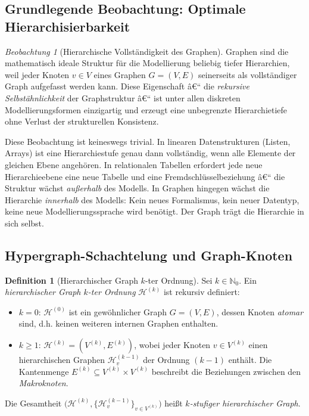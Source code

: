 ﻿\documentclass[12pt,a4paper,twoside]{article}
\theoremstyle{definition}
\newtheorem{definition}{Definition}[section]
\theoremstyle{plain}
\theoremstyle{remark}
\newtheorem{beobachtung}{Beobachtung}[section]
\begin{document}
\subsection{Grundlegende Beobachtung: Optimale Hierarchisierbarkeit}
\label{sub:beobachtung_hierarchie}

\begin{beobachtung}[Hierarchische Vollständigkeit des Graphen]
	\label{beob:hierarchie}
	Graphen sind die mathematisch ideale Struktur für die Modellierung
	beliebig tiefer Hierarchien, weil jeder Knoten $v \in V$ eines Graphen
	$G = (V, E)$ seinerseits als vollständiger Graph aufgefasst werden kann.
	Diese Eigenschaft â€“ die \emph{rekursive Selbstähnlichkeit} der
	Graphstruktur â€“ ist unter allen diskreten Modellierungsformen einzigartig
	und erzeugt eine unbegrenzte Hierarchietiefe ohne Verlust der
	strukturellen Konsistenz.
\end{beobachtung}

Diese Beobachtung ist keineswegs trivial.  In linearen Datenstrukturen
(Listen, Arrays) ist eine Hierarchiestufe genau dann vollständig, wenn
alle Elemente der gleichen Ebene angehören.  In relationalen Tabellen
erfordert jede neue Hierarchieebene eine neue Tabelle und eine
Fremdschlüsselbeziehung â€“ die Struktur wächst \emph{außerhalb} des
Modells.  In Graphen hingegen wächst die Hierarchie \emph{innerhalb}
des Modells: Kein neues Formalismus, kein neuer Datentyp, keine neue
Modellierungssprache wird benötigt.  Der Graph trägt die Hierarchie
in sich selbst.

\subsection{Hypergraph-Schachtelung und Graph-Knoten}
\label{sub:def_hierarchie}

\begin{definition}[Hierarchischer Graph $k$-ter Ordnung]
	\label{def:hgraph}
	Sei $k \in \mathbb{N}_0$.  Ein \emph{hierarchischer Graph $k$-ter
		Ordnung} $\mathcal{H}^{(k)}$ ist rekursiv definiert:
	\begin{itemize}
		\item $k = 0$: $\mathcal{H}^{(0)}$ ist ein gewöhnlicher Graph
		$G = (V, E)$, dessen Knoten \emph{atomar} sind, d.h. keinen
		weiteren internen Graphen enthalten.
		\item $k \geq 1$: $\mathcal{H}^{(k)} = (V^{(k)}, E^{(k)})$, wobei
		jeder Knoten $v \in V^{(k)}$ einen hierarchischen Graphen
		$\mathcal{H}^{(k-1)}_v$ der Ordnung $(k-1)$ enthält.  Die
		Kantenmenge $E^{(k)} \subseteq V^{(k)} \times V^{(k)}$ beschreibt
		die Beziehungen zwischen den \emph{Makroknoten}.
	\end{itemize}
	Die Gesamtheit $\bigl(\mathcal{H}^{(k)}, \{\mathcal{H}^{(k-1)}_v\}_{v \in V^{(k)}}\bigr)$
	heißt \emph{$k$-stufiger hierarchischer Graph}.
\end{definition}
\end{document}

